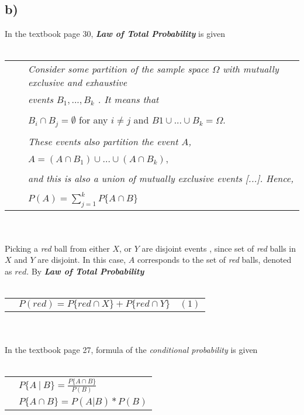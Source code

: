 \documentclass[12pt]{article}
\begin{document}
\subsection*{b)}
In the textbook page 30, \textit{\textbf{Law of Total Probability}} is given
\\ \\
\begin{tabular}{l l l}
    && \textit{Consider some partition of the sample space $\Omega$ with mutually exclusive and exhaustive}\\
    &&\textit{events $B_1 , . . . , B_k$ . It means that }\\
    \\
    && $B_i \cap B_j = \emptyset$ for any $i \neq j$ and $B 1 \cup . . . \cup B_k = \Omega.$\\
    \\
    &&\textit{These events also partition the event $A$,}\\
    \\
    && $A=(A \cap B_1 )\cup . . . \cup(A \cap B_k ),$\\
    \\
    && \textit{and this is also a union of mutually exclusive events [...]. Hence,}\\
    \\
    && $P(A) = \sum\limits_{j=1}^{k} P\{A \cap B\}$\\
\end{tabular}
\\ \\
Picking a \textit{red} ball from either $X$, or $Y$ are disjoint events 
, since set of \textit{red}
balls in $X$ and $Y$ are disjoint.
In this case, $A$ corresponds to the set of \textit{red} balls, denoted as $red$.
By \hypertarget{eq1}{\textit{\textbf{Law of Total Probability}}}
\\ \\
\begin{tabular}{l l}
    & $P(red) = P\{red \cap X\} + P\{red \cap Y\}\quad (1)$\\
\end{tabular}
\\ \\
In the textbook page 27, \hypertarget{cond}{formula of the \textit{conditional probability}} is given
\\ \\
\begin{tabular}{l l}
    & $P\{A\ |\ B\}=\frac{P\{A\cap B\}}{P(B)} $\\
    & $P\{A\cap B\}=P(A|B)*P(B) $\\
\end{tabular}
\end{document}
